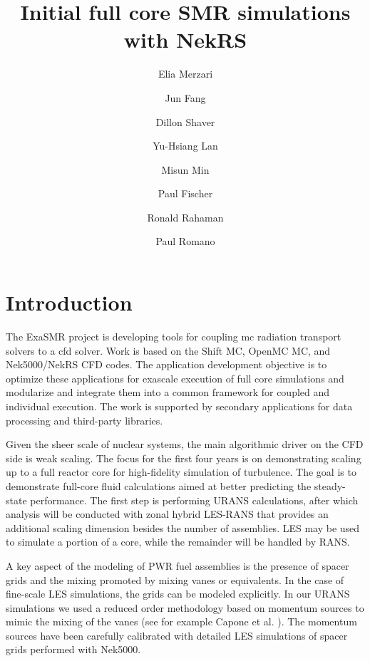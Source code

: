 \documentclass[11pt,letterpaper]{report}
\title{Initial full core SMR simulations with NekRS}
\author[1,2]{\rm Elia Merzari}
\author[2]{Jun Fang}
\author[2]{Dillon Shaver}
\author[3]{Yu-Hsiang Lan}
\author[3]{Misun Min}
\author[3]{Paul Fischer}
\author[4]{Ronald Rahaman}
\author[4]{Paul Romano}
\affil[1]{Nuclear Engineering Department, Pennsylvania State University}
\affil[2]{Nuclear Science and Engineering Division, Argonne National Laboratory }
\affil[3]{Mathematics and Computer Science Division, Argonne National Laboratory }
\affil[4]{Computational Science Division, Argonne National Laboratory }
\begin{document}
\maketitle
\clearpage
\thispagestyle{empty}
\tableofcontents
\clearpage
\listoffigures
\listoftables
\newpage
\printglossary
\newpage

\graphicspath{{./Figs/}}



\newpage
{}
\setcounter{page}{1}


\section{Introduction}

The ExaSMR project is developing tools for coupling \acf{mc} radiation
transport solvers to a \acf{cfd} solver.  Work is based on the Shift MC, OpenMC MC, and Nek5000/NekRS CFD codes. The application development objective is to optimize these applications for exascale execution of full core simulations and modularize and integrate them into a common framework for coupled and individual execution. The work is supported by secondary applications for data processing and third-party libraries.

Given the sheer scale of nuclear systems, the main algorithmic driver on the CFD side is weak scaling.
The focus for the first four years is  on demonstrating scaling up to a full reactor core for high-fidelity simulation of turbulence. The goal is to demonstrate full-core fluid calculations aimed at better predicting the steady-state performance. The first step is performing URANS calculations, after which analysis will be conducted with zonal hybrid LES-RANS that provides an additional scaling dimension besides the number of assemblies. LES may be used to simulate a portion of a core, while the remainder will be handled by RANS.

A key aspect of the modeling of PWR fuel assemblies is the presence of spacer grids and the mixing promoted by mixing vanes or equivalents. In the case of fine-scale LES simulations, the grids can be modeled explicitly. In our URANS simulations we used a reduced order methodology based on momentum sources to mimic the mixing of the vanes (see for example Capone et al. \cite{Capone2016}). The momentum sources have been carefully calibrated with detailed LES simulations of spacer grids performed with Nek5000.
\end{document}
